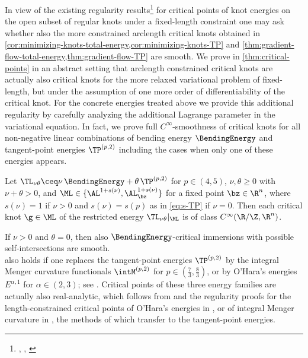 In view of the existing regularity results\footnote{ 
\cite[Theorem 1.5]{blatt-reiter_2015a}, \cite[Theorem 4]{blatt-reiter_2015b}, \cite[Theorem 1.2]{blatt-reiter_2013}}
for critical points of knot energies
on the open subset of regular knots under a fixed-length
constraint 
one may ask whether also the more constrained arclength critical knots obtained in
\cref{cor:minimizing-knots-total-energy,cor:minimizing-knots-TP} and \cref{thm:gradient-flow-total-energy,thm:gradient-flow-TP} are smooth. 
We prove in \cref{thm:critical-points} in an abstract setting that
arclength constrained critical knots are actually also critical knots for the more
relaxed variational problem of fixed-length, but under the assumption of 
one more
order of differentiability of the critical knot. 
 For the concrete
energies treated above  we provide this additional regularity
by carefully analyzing the additional Lagrange parameter in the variational equation.
In fact, we prove full $C^\infty$-smoothness of critical knots
for all non-negative linear combinations
of bending energy $\BendingEnergy$ and tangent-point energies $\TP^{(p,2)}$ including
the cases when only one of these energies appears.
\begin{theorem}
\label{thm:smoothness}
Let $\TL_{\nu\theta}\ceq\nu \, \BendingEnergy + \theta \, \TP^{(p,2)}$ for 
 $p\in (4,5)$, $\nu,\theta\ge 0$ with $\nu+\theta>0$,
and $\ML\in\{\AL^{1+s(\nu)},\AL^{1+s(\nu)}_\bz\}$ for a fixed point 
$\bz\in\R^n$, where $s(\nu)=1$ if $\nu >0$ and $s(\nu)=s(p)$ as in \cref{eq:s-TP} if
$\nu=0$. Then   
each critical knot $\g\in\ML$
of the restricted energy $\TL_{\nu\theta}|_{\ML}$ is of class $C^\infty(\R/\Z,\R^n)$.
\end{theorem}
If $ \nu>0 $ and $ \theta=0 $, then also $ \BendingEnergy $-critical immersions with possible self-intersections are smooth.\\
 also holds if one replaces the tangent-point energies
$\TP^{(p,2)}$ by the integral Menger curvature functionals $\intM^{(p,2)}$
for $p\in (\frac{7}{3},\frac{8}{3})$, or by O'Hara's energies
$E^{\alpha,1}$ for $\alpha\in (2,3)$; see \cite{freches_2025}. 
Critical points of these three energy families
are actually  also real-analytic, 
which follows from  and the regularity proofs
for the length-constrained critical points of  O'Hara's energies
in \cite{vorderobermeier_2020}, or of
integral Menger curvature in \cite{steenebruegge-vorderobermeier_2022}, the methods of which transfer to the tangent-point energies. 


